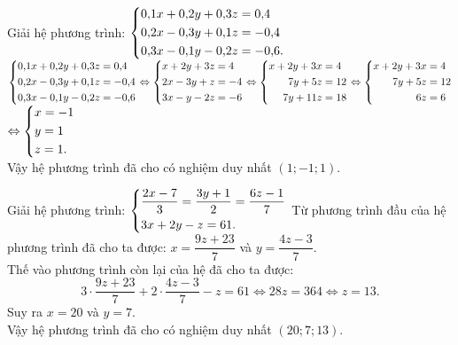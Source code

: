 \begin{ex}%
 Giải hệ phương trình: $\left\{\begin{aligned}& 0{,}1 x + 0{,}2 y + 0{,}3 z = 0{,}4 \\& 0{,}2 x - 0{,}3 y + 0{,}1 z = -0{,}4 \\& 0{,}3 x - 0{,}1 y - 0{,}2 z = -0{,}6.\end{aligned}\right.$
 \loigiai
  {
  \hspace*{0.5cm}$\left\{\begin{aligned}& 0{,}1 x + 0{,}2 y + 0{,}3 z = 0{,}4 \\& 0{,}2 x - 0{,}3 y + 0{,}1 z = -0{,}4 \\& 0{,}3 x - 0{,}1 y - 0{,}2 z = -0{,}6\end{aligned}\right.
  \Leftrightarrow \left\{\begin{aligned}& x+2y+3z=4 \\& 2x-3y+z=-4 \\& 3x-y-2z=-6\end{aligned}\right.
  \Leftrightarrow \left\{\begin{aligned}x+2y+3x &= 4 \\ 7y+5z &=12 \\ 7y+11z &= 18\end{aligned}\right.
  \Leftrightarrow \left\{\begin{aligned}x+2y+3x &= 4 \\ 7y+5z &=12 \\ 6z &= 6\end{aligned}\right.$\\
  $\Leftrightarrow \left\{\begin{aligned}& x = -1 \\& y = 1 \\& z = 1.\end{aligned}\right.$\\
  Vậy hệ phương trình đã cho có nghiệm duy nhất $(1;-1;1)$.
  }
\end{ex}


\begin{ex}%
 Giải hệ phương trình: $\left\{\begin{aligned}& \dfrac{2x-7}{3} = \dfrac{3y+1}{2} = \dfrac{6z-1}{7} \\& 3x+2y-z = 61.\end{aligned}\right.$
 \loigiai
  {
  Từ phương trình đầu của hệ phương trình đã cho ta được: $x = \dfrac{9z+23}{7}$ và $y = \dfrac{4z-3}{7}$.\\
  Thế vào phương trình còn lại của hệ đã cho ta được:
  $$3 \cdot \dfrac{9z+23}{7} + 2 \cdot \dfrac{4z-3}{7} - z = 61 \Leftrightarrow 28z = 364 \Leftrightarrow z = 13.$$
  Suy ra $x = 20$ và $y = 7$.\\
  Vậy hệ phương trình đã cho có nghiệm duy nhất $(20;7;13)$.
  }
\end{ex}



